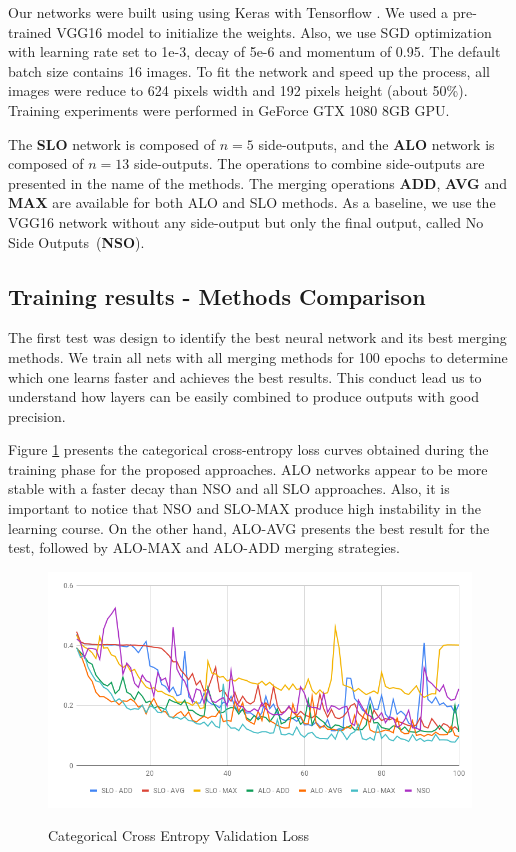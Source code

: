 Our networks were built using using Keras \cite{chollet2015keras} with Tensorflow \cite{tensorflow2015-whitepaper}. We used a pre-trained VGG16 model to initialize the weights. Also, we use SGD optimization with learning rate set to 1e-3, decay of 5e-6 and momentum of 0.95. The default batch size contains 16 images. To fit the network and speed up the process, all images were reduce to 624 pixels width and 192 pixels height (about 50\%). Training experiments were performed in GeForce GTX 1080 8GB GPU.

The \textbf{SLO} network is composed of $n=5$ side-outputs, and the \textbf{ALO} network is composed of $n=13$ side-outputs. 
The operations to combine side-outputs are presented in the name of the methods. The merging operations \textbf{ADD}, \textbf{AVG} and \textbf{MAX} are available for both ALO and SLO methods.
As a baseline, we use the VGG16 network without any side-output but only the final output, called No Side Outputs~(\textbf{NSO}).

\subsection{Training results - Methods Comparison}

The first test was design to identify the best neural network and its best merging methods. We train all nets with all merging methods for 100 epochs to determine which one learns faster and achieves the best results. This conduct lead us to understand how layers can be easily combined to produce outputs with good precision.

Figure \ref{fig:validation_loss} presents the categorical cross-entropy loss curves obtained during the training phase for the proposed approaches. ALO networks appear to be more stable with a faster decay than NSO and all SLO approaches. Also, it is important to notice that NSO and SLO-MAX produce high instability in the learning course. On the other hand, ALO-AVG presents the best result for the test, followed by ALO-MAX and ALO-ADD merging strategies.

\begin{figure}
  \caption{Categorical Cross Entropy Validation Loss}
  \centering
    \includegraphics[width=1.\columnwidth]{figures/falreis/validation_loss.png}
  \label{fig:validation_loss}
\end{figure}

